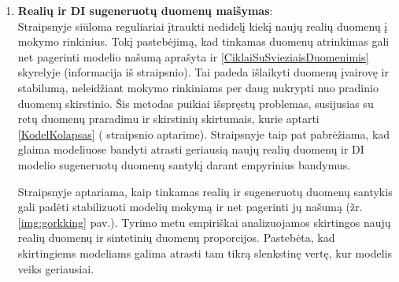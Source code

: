 \documentclass{VUMIFInfKursinis}
\begin{document}
\begin{enumerate}
    \item \textbf{Realių ir DI sugeneruotų duomenų maišymas}:
    \\
        Straipsnyje siūloma reguliariai įtraukti nedidelį kiekį naujų realių duomenų į mokymo rinkinius. Tokį pastebėjimą, kad tinkamas duomenų atrinkimas gali net pagerinti modelio našumą aprašyta ir \ref{CiklaiSuSvieziaisDuomenimis} skyrelyje (informacija iš \cite{ModelsGoMAD} straipsnio). Tai padeda išlaikyti duomenų įvairovę ir stabilumą, neleidžiant mokymo rinkiniams per daug nukrypti nuo pradinio duomenų skirstinio. Šis metodas puikiai išspręstų problemas, susijusias su retų duomenų praradimu ir skirstinių skirtumais, kurie aptarti \ref{KodelKolapsas} ( \cite{AICollapseNature} straipsnio aptarime). Straipsnyje \cite{DesniuPasiulymai} taip pat pabrėžiama, kad glaima modeliuose bandyti atrasti geriausią naujų realių duomenų ir DI modelio sugeneruotų duomenų santykį darant empyrinius bandymus.
     
        Straipsnyje \cite{DesniuPasiulymai}
        aptariama, kaip tinkamas realių ir sugeneruotų duomenų santykis gali padėti stabilizuoti modelių mokymą ir net pagerinti jų našumą (žr. \ref{img:gorkking} pav.). Tyrimo metu empiriškai analizuojamos skirtingos naujų realių duomenų ir sintetinių duomenų proporcijos. Pastebėta, kad skirtingiems modeliams galima atrasti tam tikrą slenkstinę vertę, kur modelis veiks geriausiai. 



\end{enumerate}
\end{document}
